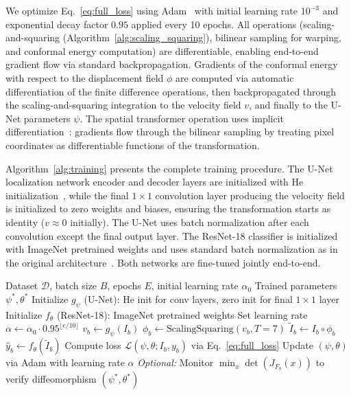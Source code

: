 \documentclass[final,3p,times,review,sort&compress]{elsarticle}
\begin{document}
We optimize Eq.~\eqref{eq:full_loss} using Adam~\cite{kingma2014adam} with initial learning rate $10^{-3}$ and exponential decay factor $0.95$ applied every 10 epochs. All operations (scaling-and-squaring (Algorithm~\ref{alg:scaling_squaring}), bilinear sampling for warping, and conformal energy computation) are differentiable, enabling end-to-end gradient flow via standard backpropagation. Gradients of the conformal energy with respect to the displacement field $\phi$ are computed via automatic differentiation of the finite difference operations, then backpropagated through the scaling-and-squaring integration to the velocity field $v$, and finally to the U-Net parameters $\psi$. The spatial transformer operation uses implicit differentiation~\cite{jaderberg2015spatial}: gradients flow through the bilinear sampling by treating pixel coordinates as differentiable functions of the transformation.

Algorithm~\ref{alg:training} presents the complete training procedure. The U-Net localization network encoder and decoder layers are initialized with He initialization~\cite{he2016identity}, while the final $1 \times 1$ convolution layer producing the velocity field is initialized to zero weights and biases, ensuring the transformation starts as identity ($v \approx 0$ initially). The U-Net uses batch normalization after each convolution except the final output layer. The ResNet-18 classifier is initialized with ImageNet pretrained weights and uses standard batch normalization as in the original architecture~\cite{he2016resnet}. Both networks are fine-tuned jointly end-to-end.

\begin{algorithm}[t]
\caption{DCA Training Procedure}
\label{alg:training}
\begin{algorithmic}[1]
\REQUIRE Dataset $\mathcal{D}$, batch size $B$, epochs $E$, initial learning rate $\alpha_0$
\ENSURE Trained parameters $\psi^*, \theta^*$
\STATE Initialize $g_\psi$ (U-Net): He init for conv layers, zero init for final $1 \times 1$ layer
\STATE Initialize $f_\theta$ (ResNet-18): ImageNet pretrained weights
    \STATE Set learning rate $\alpha \leftarrow \alpha_0 \cdot 0.95^{\lfloor e/10 \rfloor}$
        \STATE $v_b \leftarrow g_\psi(I_b)$ \quad {}
        \STATE $\phi_b \leftarrow \text{ScalingSquaring}(v_b, T=7)$ \quad {}
        \STATE $\tilde{I}_b \leftarrow I_b \circ \phi_b$ \quad {}
        \STATE $\hat{y}_b \leftarrow f_\theta(\tilde{I}_b)$ \quad {}
        \STATE Compute loss $\mathcal{L}(\psi, \theta; I_b, y_b)$ via Eq.~\eqref{eq:full_loss}
        \STATE Update $(\psi, \theta)$ via Adam with learning rate $\alpha$
        \STATE \textit{Optional:} Monitor $\min_x \det(J_{F_b}(x))$ to verify diffeomorphism
    \ENDFOR
\ENDFOR
\RETURN $(\psi^*, \theta^*)$
\end{algorithmic}
\end{algorithm}
\end{document}
